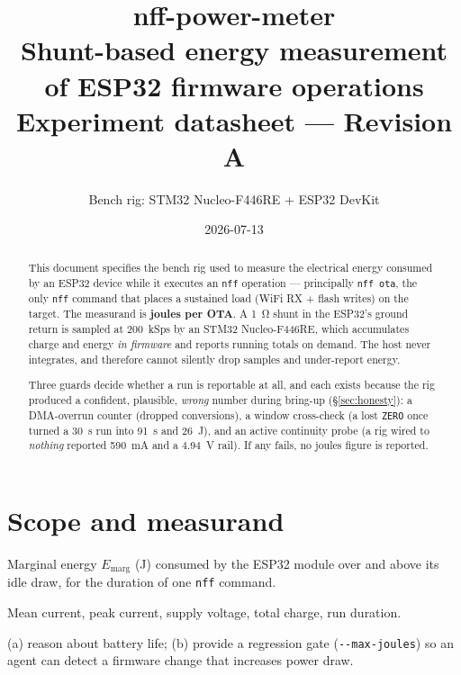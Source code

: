 \documentclass[11pt,a4paper]{article}
\title{\textbf{nff-power-meter}\\[2mm]
\large Shunt-based energy measurement of ESP32 firmware operations\\[1mm]
\normalsize Experiment datasheet --- Revision A}
\author{Bench rig: STM32 Nucleo-F446RE + ESP32 DevKit}
\date{2026-07-13}
\begin{document}
\maketitle
\thispagestyle{fancy}

\begin{abstract}
\noindent
This document specifies the bench rig used to measure the electrical energy consumed
by an ESP32 device while it executes an \texttt{nff} operation --- principally
\texttt{nff ota}, the only \texttt{nff} command that places a sustained load
(WiFi RX + flash writes) on the target. The measurand is \textbf{joules per OTA}.
A \SI{1}{\ohm} shunt in the ESP32's ground return is sampled at \SI{200}{kSps} by an
STM32 Nucleo-F446RE, which accumulates charge and energy \emph{in firmware} and reports running
totals on demand. The host never integrates, and therefore cannot silently drop samples and
under-report energy.

\medskip
\noindent
Three guards decide whether a run is reportable at all, and each exists because the rig produced
a confident, plausible, \emph{wrong} number during bring-up (\S\ref{sec:honesty}): a DMA-overrun
counter (dropped conversions), a window cross-check (a lost \texttt{ZERO} once turned a
\SI{30}{\second} run into \SI{91}{\second} and \SI{26}{\joule}), and an active continuity probe
(a rig wired to \emph{nothing} reported \SI{590}{\milli\ampere} and a \SI{4.94}{\volt} rail). If
any fails, no joules figure is reported.
\end{abstract}

\clearpage
\tableofcontents
\clearpage

\section{Scope and measurand}

\begin{description}[style=nextline,leftmargin=0pt]
  \item[Primary measurand] Marginal energy $E_\text{marg}$ (\si{\joule}) consumed by the
        ESP32 module over and above its idle draw, for the duration of one \texttt{nff}
        command.
  \item[Secondary] Mean current, peak current, supply voltage, total charge, run duration.
  \item[Purpose] (a) reason about battery life; (b) provide a regression gate
        (\texttt{-{}-max-joules}) so an agent can detect a firmware change that increases
        power draw.
\end{description}
\end{document}
